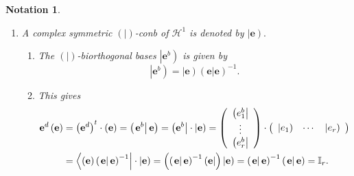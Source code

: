\documentclass[aps,preprint]{revtex4}
\newtheorem{notation}[theorem]{Notation}
\begin{document}
\begin{notation}
\begin{enumerate}
\item A complex symmetric $\left( \left. {}\right\vert \right) $-conb of $%
\mathcal{H}^{1}$ is denoted by $\left\vert \mathbf{e}\right) .$

\begin{enumerate}
\item The $\left( \left. {}\right\vert \right) $-biorthogonal bases $%
\left\vert \mathbf{e}^{b}\right) $ is given by 
\begin{equation}
\left\vert \mathbf{e}^{b}\right) =\left\vert \mathbf{e}\right) \left( \left. 
\mathbf{e}\right\vert \mathbf{e}\right) ^{-1}.
\end{equation}

\item This gives%
\begin{align}
\mathbf{e}^{d}\left( \mathbf{e}\right) & =\left( \mathbf{e}^{d}\right)
^{t}\cdot \left( \mathbf{e}\right) =\left( \left. \mathbf{e}^{b}\right\vert 
\mathbf{e}\right) =\left( \mathbf{e}^{b}\right\vert \cdot \left\vert \mathbf{%
e}\right) =\left( 
\begin{array}{c}
\left( e_{1}^{b}\right\vert \\ 
\vdots \\ 
\left( e_{r}^{b}\right\vert%
\end{array}%
\right) \cdot \left( 
\begin{array}{ccc}
\left\vert e_{1}\right) & \cdots & \left\vert e_{r}\right)%
\end{array}%
\right) \\
& =\left\langle \left( \mathbf{e}\right) \left( \left. \mathbf{e}\right\vert 
\mathbf{e}\right) ^{-1}\right\vert \cdot \left\vert \mathbf{e}\right)
=\left( \left( \left. \mathbf{e}\right\vert \mathbf{e}\right) ^{-1}\left( 
\mathbf{e}\right\vert \right) \left\vert \mathbf{e}\right) =\left( \left. 
\mathbf{e}\right\vert \mathbf{e}\right) ^{-1}\left( \left. \mathbf{e}%
\right\vert \mathbf{e}\right) =\mathbb{I}_{r}.
\end{align}
\end{enumerate}
\end{enumerate}
\end{notation}
\end{document}
